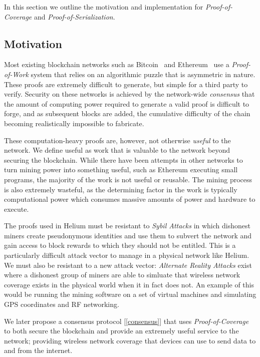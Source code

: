 \documentclass[letterpaper,11pt]{article}
\def\proofofcoverage/{\emph{Proof-of-Coverage}}
\begin{document}
In this section we outline the motivation and implementation for \proofofcoverage/ and \emph{Proof-of-Serialization}.

\subsection{Motivation}

Most existing blockchain networks such as Bitcoin~\cite{bitcoin} and Ethereum~\cite{ethereum} use a \emph{Proof-of-Work} system that relies on an algorithmic puzzle that is asymmetric in nature. These proofs are extremely difficult to generate, but simple for a third party to verify. Security on these networks is achieved by the network-wide \emph{consensus} that the amount of computing power required to generate a valid proof is difficult to forge, and as subsequent blocks are added, the cumulative difficulty of the chain becoming realistically impossible to fabricate. \newline

These computation-heavy proofs are, however, not otherwise \emph{useful} to the network. We define useful as work that is valuable to the network beyond securing the blockchain. While there have been attempts in other networks to turn mining power into something useful, such as Ethereum executing small programs, the majority of the work is not useful or reusable. The mining process is also extremely wasteful, as the determining factor in the work is typically computational power which consumes massive amounts of power and hardware to execute.\newline

The proofs used in Helium must be resistant to \emph{Sybil Attacks} in which dishonest miners create pseudonymous identities and use them to subvert the network and gain access to block rewards to which they should not be entitled. This is a particularly difficult attack vector to manage in a physical network like Helium. We must also be resistant to a new attack vector: \emph{Alternate Reality Attacks} exist where a dishonest group of miners are able to simluate that wireless network coverage exists in the physical world when it in fact does not. An example of this would be running the mining software on a set of virtual machines and simulating GPS coordinates and RF networking.\newline

We later propose a consensus protocol [\ref{consensus}] that uses \proofofcoverage/ to both secure the blockchain and provide an extremely useful service to the network; providing wireless network coverage that devices can use to send data to and from the internet.
\end{document}
